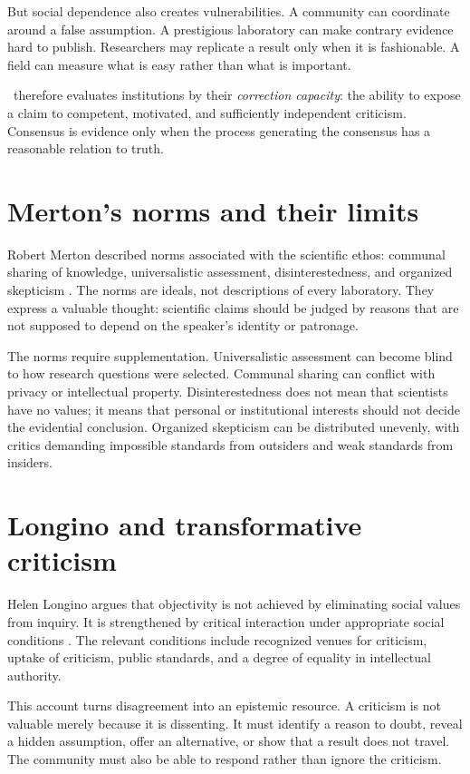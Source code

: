 But social dependence also creates vulnerabilities. A community can coordinate
around a false assumption. A prestigious laboratory can make contrary evidence
hard to publish. Researchers may replicate a result only when it is fashionable.
A field can measure what is easy rather than what is important.

\RCR\ therefore evaluates institutions by their \emph{correction capacity}:
the ability to expose a claim to competent, motivated, and sufficiently
independent criticism. Consensus is evidence only when the process generating
the consensus has a reasonable relation to truth.

\section{Merton's norms and their limits}

Robert Merton described norms associated with the scientific ethos:
communal sharing of knowledge, universalistic assessment, disinterestedness,
and organized skepticism \citep{merton1942}. The norms are ideals, not
descriptions of every laboratory. They express a valuable thought: scientific
claims should be judged by reasons that are not supposed to depend on the
speaker's identity or patronage.

The norms require supplementation. Universalistic assessment can become blind
to how research questions were selected. Communal sharing can conflict with
privacy or intellectual property. Disinterestedness does not mean that
scientists have no values; it means that personal or institutional interests
should not decide the evidential conclusion. Organized skepticism can be
distributed unevenly, with critics demanding impossible standards from
outsiders and weak standards from insiders.

\section{Longino and transformative criticism}

Helen Longino argues that objectivity is not achieved by eliminating social
values from inquiry. It is strengthened by critical interaction under
appropriate social conditions \citep{longino1990}. The relevant conditions
include recognized venues for criticism, uptake of criticism, public
standards, and a degree of equality in intellectual authority.

This account turns disagreement into an epistemic resource. A criticism is not
valuable merely because it is dissenting. It must identify a reason to doubt,
reveal a hidden assumption, offer an alternative, or show that a result does
not travel. The community must also be able to respond rather than ignore the
criticism.

